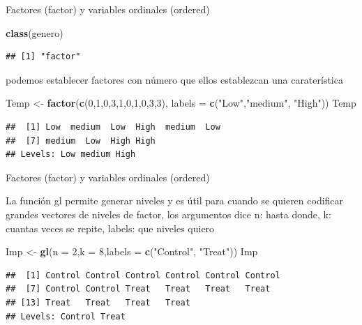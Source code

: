 \documentclass[ignorenonframetext,]{beamer}
\newenvironment{Shaded}{\begin{snugshade}}{\end{snugshade}}
\newcommand{\KeywordTok}[1]{\textcolor[rgb]{0.13,0.29,0.53}{\textbf{#1}}}
\newcommand{\DataTypeTok}[1]{\textcolor[rgb]{0.13,0.29,0.53}{#1}}
\newcommand{\DecValTok}[1]{\textcolor[rgb]{0.00,0.00,0.81}{#1}}
\newcommand{\StringTok}[1]{\textcolor[rgb]{0.31,0.60,0.02}{#1}}
\newcommand{\NormalTok}[1]{#1}
\begin{document}
\begin{frame}[fragile]{Factores (factor) y variables ordinales
(ordered)}

\begin{Shaded}
\begin{Highlighting}[]
\KeywordTok{class}\NormalTok{(genero)}
\end{Highlighting}
\end{Shaded}

\begin{verbatim}
## [1] "factor"
\end{verbatim}

podemos establecer factores con número que ellos establezcan una
caraterística

\begin{Shaded}
\begin{Highlighting}[]
\NormalTok{Temp <-}\StringTok{ }\KeywordTok{factor}\NormalTok{(}\KeywordTok{c}\NormalTok{(}\DecValTok{0}\NormalTok{,}\DecValTok{1}\NormalTok{,}\DecValTok{0}\NormalTok{,}\DecValTok{3}\NormalTok{,}\DecValTok{1}\NormalTok{,}\DecValTok{0}\NormalTok{,}\DecValTok{1}\NormalTok{,}\DecValTok{0}\NormalTok{,}\DecValTok{3}\NormalTok{,}\DecValTok{3}\NormalTok{), }
               \DataTypeTok{labels =} \KeywordTok{c}\NormalTok{(}\StringTok{"Low"}\NormalTok{,}\StringTok{"medium"}\NormalTok{, }\StringTok{"High"}\NormalTok{))}
\NormalTok{Temp}
\end{Highlighting}
\end{Shaded}

\begin{verbatim}
##  [1] Low  medium  Low  High  medium  Low
##  [7] medium  Low  High High  
## Levels: Low medium High
\end{verbatim}

\end{frame}

\begin{frame}[fragile]{Factores (factor) y variables ordinales
(ordered)}

La función gl permite generar niveles y es útil para cuando se quieren
codificar grandes vectores de niveles de factor, los argumentos dice n:
hasta donde, k: cuantas veces se repite, labels: que niveles quiero

\begin{Shaded}
\begin{Highlighting}[]
\NormalTok{Imp <-}\StringTok{ }\KeywordTok{gl}\NormalTok{(}\DataTypeTok{n =} \DecValTok{2}\NormalTok{,}\DataTypeTok{k =} \DecValTok{8}\NormalTok{,}\DataTypeTok{labels =} \KeywordTok{c}\NormalTok{(}\StringTok{"Control"}\NormalTok{, }\StringTok{"Treat"}\NormalTok{))}
\NormalTok{Imp}
\end{Highlighting}
\end{Shaded}

\begin{verbatim}
##  [1] Control Control Control Control Control Control 
##  [7] Control Control Treat   Treat   Treat   Treat  
## [13] Treat   Treat   Treat   Treat  
## Levels: Control Treat
\end{verbatim}

\end{frame}
\end{document}
